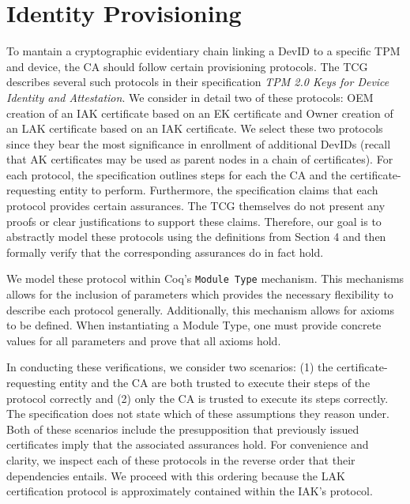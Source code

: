 \chapter{Identity Provisioning}

To mantain a cryptographic evidentiary chain linking a DevID to a specific TPM and device, the CA should follow certain provisioning protocols. The TCG describes several such protocols in their specification \textit{TPM 2.0 Keys for Device Identity and Attestation}. We consider in detail two of these protocols: OEM creation of an IAK certificate based on an EK certificate and Owner creation of an LAK certificate based on an IAK certificate. We select these two protocols since they bear the most significance in enrollment of additional DevIDs (recall that AK certificates may be used as parent nodes in a chain of certificates). For each protocol, the specification outlines steps for each the CA and the certificate-requesting entity to perform. Furthermore, the specification claims that each protocol provides certain assurances. The TCG themselves do not present any proofs or clear justifications to support these claims. Therefore, our goal is to abstractly model these protocols using the definitions from Section 4 and then formally verify that the corresponding assurances do in fact hold. 


We model these protocol within Coq's \verb|Module Type| mechanism. This mechanisms allows for the inclusion of parameters which provides the necessary flexibility to describe each protocol generally. Additionally, this mechanism allows for axioms to be defined. When instantiating a Module Type, one must provide concrete values for all parameters and prove that all axioms hold.

In conducting these verifications, we consider two scenarios: (1) the certificate-requesting entity and the CA are both trusted to execute their steps of the protocol correctly and (2) only the CA is trusted to execute its steps correctly. The specification does not state which of these assumptions they reason under. Both of these scenarios include the presupposition that 
previously issued certificates imply that the associated assurances hold.
For convenience and clarity, we inspect each of these protocols in the reverse order that their dependencies entails. We proceed with this ordering because the LAK certification protocol is approximately contained within the IAK's protocol. 

